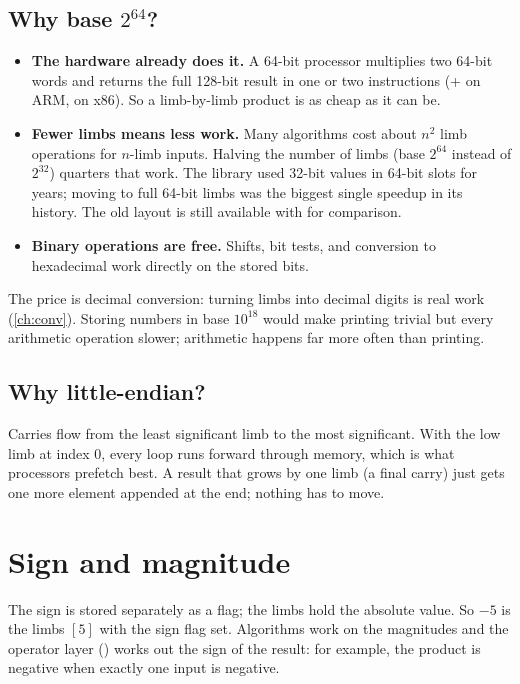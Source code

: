 \subsection{Why base $2^{64}$?}

\begin{itemize}
  \item \textbf{The hardware already does it.} A 64-bit processor multiplies two
        64-bit words and returns the full 128-bit result in one or two
        instructions (+ on ARM,  on x86). So a
        limb-by-limb product is as cheap as it can be.
  \item \textbf{Fewer limbs means less work.} Many algorithms cost about $n^2$
        limb operations for $n$-limb inputs. Halving the number of limbs
        (base $2^{64}$ instead of $2^{32}$) quarters that work. The library used
        32-bit values in 64-bit slots for years; moving to full 64-bit limbs was
        the biggest single speedup in its history. The old layout is still
        available with  for comparison.
  \item \textbf{Binary operations are free.} Shifts, bit tests, and conversion
        to hexadecimal work directly on the stored bits.
\end{itemize}

The price is decimal conversion: turning limbs into decimal digits is real work
(\cref{ch:conv}). Storing numbers in base $10^{18}$ would make printing trivial but
every arithmetic operation slower; arithmetic happens far more often than printing.

\subsection{Why little-endian?}

Carries flow from the least significant limb to the most significant. With the low
limb at index 0, every loop runs forward through memory, which is what processors
prefetch best. A result that grows by one limb (a final carry) just gets one more
element appended at the end; nothing has to move.

\section{Sign and magnitude}

The sign is stored separately as a flag; the limbs hold the absolute value. So $-5$ is
the limbs $[5]$ with the sign flag set. Algorithms work on the magnitudes and the
operator layer () works out the sign of the result:
for example, the product is negative when exactly one input is negative.


